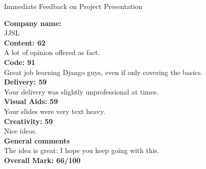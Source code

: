 \documentclass{article}
\begin{document}
\begin{center}
\Huge{Immediate Feedback on Project Presentation}\\
\end{center}


\normalsize
\textbf{Company name:}\\

JJSL \\

\textbf{Content: 62}\\

A lot of opinion offered as fact.\\

\textbf{Code: 91}\\

Great job learning Django guys, even if only covering the basics.\\

\textbf{Delivery: 59}\\

Your delivery was slightly unprofessional at times.\\

\textbf{Visual Aids: 59}\\

Your slides were very text heavy.\\

\textbf{Creativity: 59}\\

Nice ideas.\\

\textbf{General comments}\\

The idea is great: I hope you keep going with this.\\


\textbf{Overall Mark: 66/100}
\end{document}
